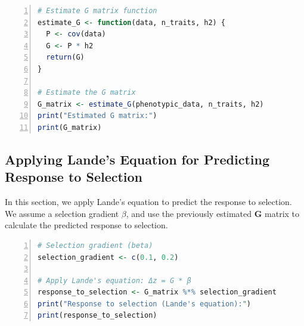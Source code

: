 \documentclass[12pt,a4paper]{article}
\begin{document}
\begin{lstlisting}[language=R, 
                   caption=Estimating Genetic Variance-Covariance Matrix,
                   basicstyle=\ttfamily\footnotesize,
                   keywordstyle=\color{blue},
                   stringstyle=\color{red},
                   commentstyle=\color{green!60!black},
                   numbers=left,
                   numberstyle=\tiny\color{gray},
                   frame=single,
                   breaklines=true,
                   linewidth=0.95\textwidth,
                   columns=flexible,
                   xleftmargin=0.05\textwidth,
                   xrightmargin=0.05\textwidth]
# Estimate G matrix function
estimate_G <- function(data, n_traits, h2) {
  P <- cov(data)
  G <- P * h2
  return(G)
}

# Estimate the G matrix
G_matrix <- estimate_G(phenotypic_data, n_traits, h2)
print("Estimated G matrix:")
print(G_matrix)
\end{lstlisting}

\subsection*{Applying Lande's Equation for Predicting Response to Selection}

In this section, we apply Lande’s equation to predict the response to selection. We assume a selection gradient \( \beta \), and use the previously estimated \( \mathbf{G} \) matrix to calculate the predicted response to selection.

\begin{lstlisting}[language=R, 
                   caption=Applying Lande's Equation,
                   basicstyle=\ttfamily\footnotesize,
                   keywordstyle=\color{blue},
                   stringstyle=\color{red},
                   commentstyle=\color{green!60!black},
                   numbers=left,
                   numberstyle=\tiny\color{gray},
                   frame=single,
                   breaklines=true,
                   linewidth=0.95\textwidth,
                   columns=flexible,
                   xleftmargin=0.05\textwidth,
                   xrightmargin=0.05\textwidth]
# Selection gradient (beta)
selection_gradient <- c(0.1, 0.2)

# Apply Lande's equation: Δz = G * β
response_to_selection <- G_matrix %*% selection_gradient
print("Response to selection (Lande's equation):")
print(response_to_selection)
\end{lstlisting}
\end{document}
